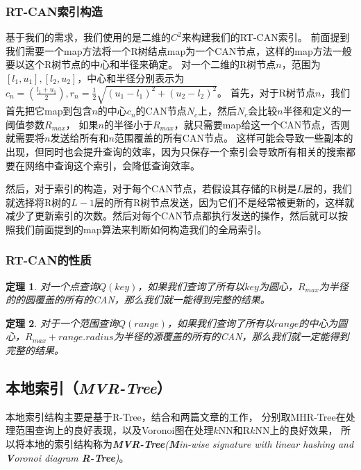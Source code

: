 \documentclass{ML}
\newtheorem{theorem}{\hspace{2em}定理}
\begin{document}
\subsubsection{RT-CAN索引构造}
基于我们的需求，我们使用的是二维的$C^2$来构建我们的RT-CAN索引。
前面提到我们需要一个map方法将一个R树结点map为一个CAN节点，这样的map方法一般要以这个R树节点的中心和半径来确定。
对一个二维的R树节点$n$，范围为$[l_1,u_1],[l_2,u_2]$，中心和半径分别表示为$c_n=(\frac{l_1+u_1}{2}),r_n=\frac{1}{2}\sqrt{(u_1-l_1)^2+(u_2-l_2)^2}$。
首先，对于R树节点$n$，我们首先把它map到包含$n$的中心$c_n$的CAN节点$N_c$上，然后$N_c$会比较$n$半径和定义的一阈值参数$R_{max}$，
如果$n$的半径小于$R_{max}$，就只需要map给这一个CAN节点，否则就需要将$n$发送给所有和$n$范围覆盖的所有CAN节点。
这样可能会导致一些副本的出现，但同时也会提升查询的效率，因为只保存一个索引会导致所有相关的搜索都要在网络中查询这个索引，会降低查询效率。

然后，对于索引的构造，对于每个CAN节点，若假设其存储的R树是$L$层的，我们就选择将R树的$L-1$层的所有R树节点发送，因为它们不是经常被更新的，这样就减少了更新索引的次数。然后对每个CAN节点都执行发送的操作，然后就可以按照我们前面提到的map算法来判断如何构造我们的全局索引。

\subsubsection{RT-CAN的性质}
\begin{theorem}\label{theorem:RT-CAN-1}
  对一个点查询$Q(key)$，如果我们查询了所有以$key$为圆心，$R_{max}$为半径的的圆覆盖的所有的CAN，那么我们就一能得到完整的结果。
\end{theorem}

\begin{theorem}\label{theorem:RT-CAN-2}
  对于一个范围查询$Q(range)$，如果我们查询了所有以$range$的中心为圆心，$R_{max}+range.radius$为半径的源覆盖的所有的CAN，那么我们就一定能得到完整的结果。
\end{theorem}

\subsection{本地索引（\textit{MVR-Tree}）}
本地索引结构主要是基于R-Tree\cite{R-Tree}，结合\cite{MHR-Tree}和\cite{VoR-Tree}两篇文章的工作，
分别取MHR-Tree在处理范围查询上的良好表现，以及Voronoi图在处理$k$NN和R$k$NN上的良好效果，
所以将本地的索引结构称为\textit{\textbf{MVR-Tree}(\textbf{M}in-wise signature with linear hashing and \textbf{V}oronoi diagram \textbf{R-Tree})}。
\end{document}
